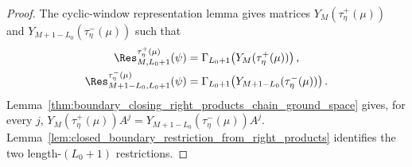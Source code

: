 \begin{proof}
    \leanok
    The cyclic-window representation lemma gives matrices
    $Y_M(\tau^+_\eta(\mu))$ and
    $Y_{M+1-L_0}(\tau^-_\eta(\mu))$ such that
    \begin{align}
        \Res^{\tau^+_\eta(\mu)}_{M,L_0+1}(\psi)
         & = \Gamma_{L_0+1}\!\left(Y_M(\tau^+_\eta(\mu))\right),
        \notag                                                           \\
        \Res^{\tau^-_\eta(\mu)}_{M+1-L_0,L_0+1}(\psi)
         & = \Gamma_{L_0+1}\!\left(Y_{M+1-L_0}(\tau^-_\eta(\mu))\right).
        \notag
    \end{align}
    Lemma~\ref{thm:boundary_closing_right_products_chain_ground_space}
    gives, for every $j$,
    $Y_M(\tau^+_\eta(\mu))A^j = Y_{M+1-L_0}(\tau^-_\eta(\mu))A^j$.
    Lemma~\ref{lem:closed_boundary_restriction_from_right_products} identifies
    the two length-$(L_0+1)$ restrictions.
\end{proof}
